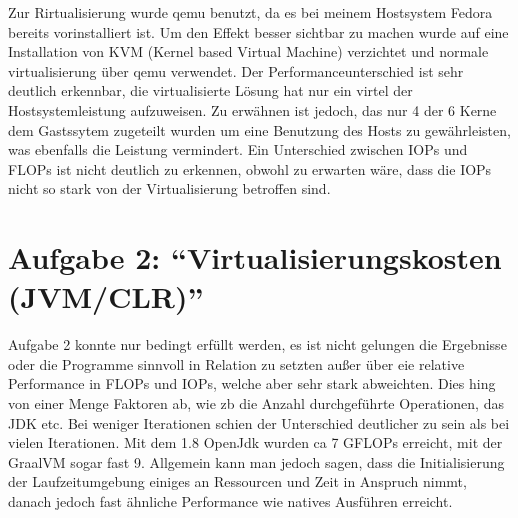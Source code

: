 \documentclass[14]{article}
\begin{document}
{Zur Rirtualisierung wurde qemu benutzt, da es bei meinem Hostsystem Fedora bereits vorinstalliert ist. Um den Effekt besser sichtbar zu machen wurde auf eine Installation von KVM (Kernel based Virtual Machine) verzichtet und normale virtualisierung über qemu verwendet. Der Performanceunterschied ist sehr deutlich erkennbar, die virtualisierte Lösung hat nur ein virtel der Hostsystemleistung aufzuweisen. Zu erwähnen ist jedoch, das nur 4 der 6 Kerne dem Gastssytem zugeteilt wurden um eine Benutzung des Hosts zu gewährleisten, was ebenfalls die Leistung vermindert.
Ein Unterschied zwischen IOPs und FLOPs ist nicht deutlich zu erkennen, obwohl zu erwarten wäre, dass die IOPs nicht so stark von der Virtualisierung betroffen sind.
}

\section{Aufgabe 2: “Virtualisierungskosten (JVM/CLR)”}
Aufgabe 2 konnte nur bedingt erfüllt werden, es ist nicht gelungen die Ergebnisse oder die Programme sinnvoll in Relation zu setzten außer über eie relative Performance in FLOPs und IOPs, welche aber sehr stark abweichten. Dies hing von einer Menge Faktoren ab, wie zb die Anzahl durchgeführte Operationen, das JDK etc. Bei weniger Iterationen schien der Unterschied deutlicher zu sein als bei vielen Iterationen. Mit dem 1.8 OpenJdk wurden ca 7 GFLOPs erreicht, mit der GraalVM sogar fast 9.
Allgemein kann man jedoch sagen, dass die Initialisierung der Laufzeitumgebung einiges an Ressourcen und Zeit in Anspruch nimmt, danach jedoch fast ähnliche Performance wie natives Ausführen erreicht.
\end{document}
